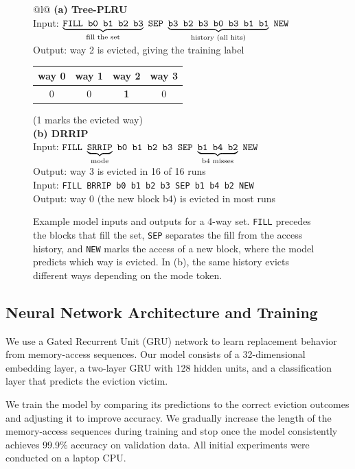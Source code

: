 \begin{figure}[htbp]
\centering
\footnotesize
\begin{tabular}{@{}l@{}}
\textbf{(a) Tree-PLRU} \\[2pt]
Input: $\underbrace{\texttt{FILL b0 b1 b2 b3}}_{\mbox{\scriptsize fill the set}}
\ \texttt{SEP}\
\underbrace{\texttt{b3 b2 b3 b0 b3 b1 b1}}_{\mbox{\scriptsize history (all hits)}}
\ \texttt{NEW}$ \\[14pt]
Output: way 2 is evicted, giving the training label \\[2pt]
\quad \begin{tabular}[t]{|c|c|c|c|}
\hline
way 0 & way 1 & way 2 & way 3 \\
\hline
0 & 0 & \textbf{1} & 0 \\
\hline
\end{tabular}
\quad (1 marks the evicted way) \\[8pt]
\textbf{(b) DRRIP} \\[2pt]
Input: $\texttt{FILL}\
\underbrace{\texttt{SRRIP}}_{\mbox{\scriptsize mode}}
\ \texttt{b0 b1 b2 b3 SEP}\
\underbrace{\texttt{b1 b4 b2}}_{\mbox{\scriptsize b4 misses}}
\ \texttt{NEW}$ \\[14pt]
Output: way 3 is evicted in 16 of 16 runs \\[4pt]
Input: \texttt{FILL BRRIP b0 b1 b2 b3 SEP b1 b4 b2 NEW} \\[2pt]
Output: way 0 (the new block b4) is evicted in most runs \\
\end{tabular}
\caption{Example model inputs and outputs for a 4-way set.
\texttt{FILL} precedes the blocks that fill the set,
\texttt{SEP} separates the fill from the access history,
and \texttt{NEW} marks the access of a new block, where the
model predicts which way is evicted. In (b), the same
history evicts different ways depending on the mode token.}
\label{fig:sample}
\end{figure}

\subsection{Neural Network Architecture and Training}

We use a Gated Recurrent Unit (GRU) network to learn
replacement behavior from memory-access sequences. Our
model consists of a 32-dimensional embedding layer, a
two-layer GRU with 128 hidden units, and a classification
layer that predicts the eviction victim.

We train the model by comparing its predictions to the correct eviction outcomes and adjusting it to improve accuracy. We gradually increase the length of the memory-access sequences during training and stop once the model consistently achieves 99.9\% accuracy on validation data. All initial experiments were conducted on a laptop CPU.

